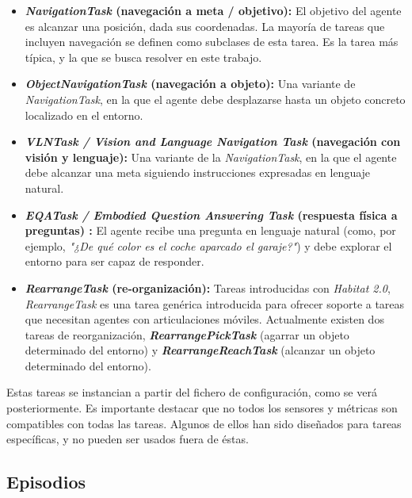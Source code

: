 \begin{itemize}
	\item \textbf{\textit{NavigationTask} (navegación a meta / objetivo):} El objetivo del agente es alcanzar una posición, dada sus coordenadas. La mayoría de tareas que incluyen navegación se definen como subclases de esta tarea. Es la tarea más típica, y la que se busca resolver en este trabajo.
	
	\item \textbf{\textit{ObjectNavigationTask} (navegación a objeto):} Una variante de \textit{NavigationTask}, en la que el agente debe desplazarse hasta un objeto concreto localizado en el entorno.
	
	\item \textbf{\textit{VLNTask / Vision and Language Navigation Task} (navegación con visión y lenguaje):} Una variante de la \textit{NavigationTask}, en la que el agente debe alcanzar una meta siguiendo instrucciones expresadas en lenguaje natural.
	
	\item \textbf{\textit{EQATask / Embodied Question Answering Task} (respuesta física a preguntas) \cite{eqa_matterport}:} El agente recibe una pregunta en lenguaje natural (como, por ejemplo, \textit{"¿De qué color es el coche aparcado el garaje?"}) y debe explorar el entorno para ser capaz de responder.
	
	\item \textbf{\textit{RearrangeTask} (re-organización):} Tareas introducidas con \textit{Habitat 2.0}, \textit{RearrangeTask} es una tarea genérica introducida para ofrecer soporte a tareas que necesitan agentes con articulaciones móviles. Actualmente existen dos tareas de reorganización, \textbf{\textit{RearrangePickTask}} (agarrar un objeto determinado del entorno) y \textbf{\textit{RearrangeReachTask}} (alcanzar un objeto determinado del entorno).
	
\end{itemize}

Estas tareas se instancian a partir del fichero de configuración, como se verá posteriormente. Es importante destacar que no todos los sensores y métricas son compatibles con todas las tareas. Algunos de ellos han sido diseñados para tareas específicas, y no pueden ser usados fuera de éstas.

\subsection{Episodios}

